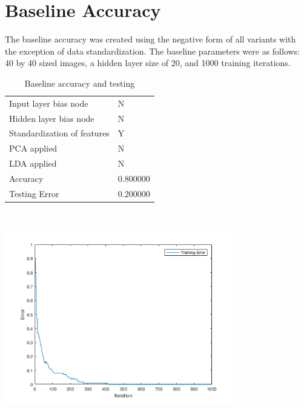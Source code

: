 \documentclass[12pt]{article}
\newcommand{\accuracyAndTestErrorTable}[8]{
  \begin{tabular}{l|l}
    \hline
    Input layer bias node & #1 \\
    Hidden layer bias node & #2 \\
    Standardization of features & #3 \\
    PCA applied & #4 \\
    LDA applied & #5 \\
    \hline
    Accuracy & #6 \\
    Testing Error & #7 \\
    \hline
  \end{tabular}
  ~\\[60pt]
  \caption{#8}
}
\begin{document}
\section{Baseline Accuracy}
The baseline accuracy was created using the negative form of all variants with the exception of data standardization. The baseline parameters were as follows: 40 by 40 sized images, a hidden layer size of 20, and 1000 training iterations.
\begin{center}
  \begin{table}[H]
    \begin{varwidth}[b]{0.4\linewidth}
      \centering
      \accuracyAndTestErrorTable{N}{N}{Y}{N}{N}{0.800000}{0.200000}{Baseline accuracy and testing}
      \label{table:baseline}
    \end{varwidth}%
    \hfill
    \begin{minipage}[b]{0.6\linewidth}
      \centering
      \includegraphics[width=100mm]{baseline_training_error.png}
      \label{fig:baseline_img}
    \end{minipage}
  \end{table}
\end{center}

\end{document}
